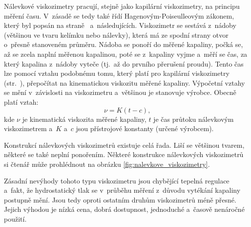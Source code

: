 \documentclass[12pt]{article}
\begin{document}
Nálevkové viskozimetry pracují, stejně jako kapilární viskozimetry, na principu měření času. V~zásadě se tedy také řídí Hagenovým-Poiseulleovým zákonem, který byl popsán na straně~\pageref{sec:tečení_trubicí} a~následujících. Viskozimetr se sestává z~nádoby (většinou ve tvaru kelímku nebo nálevky), která má ze spodní strany otvor o~přesně stanoveném průměru. Nádoba se ponoří do měřené kapaliny, počká se, až se zcela naplní měřenou kapalinou, poté se z~kapaliny vyjme a~měří se čas, za který kapalina z~nádoby vyteče (tj.~až do prvního přerušení proudu). Tento čas lze pomocí vztahu podobnému tomu, který platí pro kapilární viskozimetry (str.~\pageref{eq:kapilarni_viskozimetr}), přepočítat na kinematickou viskozitu měřené kapaliny. Výpočetní vztahy se mění v~závislosti na viskozimetru a~většinou je stanovuje výrobce. Obecně platí vztah:~\cite{Article:Rapid_and_economic_chocolate_viscosity}
\begin{equation}
    \nu = K(t-c)\text{,}
\end{equation}
kde $\nu$ je kinematická viskozita měřené kapaliny, $t$ je čas průtoku nálevkovým viskozimetrem a~$K$ a~$c$ jsou přístrojové konstanty (určené výrobcem).
\par\noindent
Konstrukcí nálevkových viskozimetrů existuje celá řada. Liší se většinou tvarem, některé se také neplní ponořením. Některé konstrukce nálevkových viskozimetrů si čtenář může prohlédnout na obrázku \ref{fig:nalevkove_viskozimetry}.
\par\noindent
Zásadní nevýhody tohoto typu viskozimetru jsou chybějící tepelná regulace a~fakt, že hydrostatický tlak se v~průběhu měření z~důvodu vytékání kapaliny postupně mění. Jsou tedy oproti ostatním druhům viskozimetrů méně přesné. Jejich výhodou je nízká cena, dobrá dostupnost, jednoduché a~časově nenáročné použití.
\end{document}
